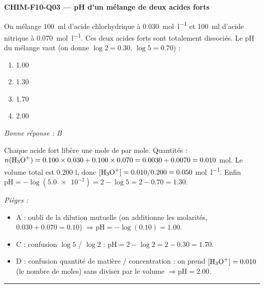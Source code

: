 \documentclass[11pt,a4paper]{article}
\begin{document}
\noindent\textbf{CHIM-F10-Q03 --- pH d'un mélange de deux acides forts}\par
On mélange \qty{100}{\milli\litre} d'acide chlorhydrique  à \qty{0.030}{\mol\per\litre} et \qty{100}{\milli\litre} d'acide nitrique  à \qty{0.070}{\mol\per\litre}. Ces deux acides forts sont totalement dissociés. Le pH du mélange vaut (on donne $\log 2 = \num{0.30}$, $\log 5 = \num{0.70}$) :
\begin{enumerate}[label=\Alph*)]
\item \num{1.00}
\item \num{1.30}
\item \num{1.70}
\item \num{2.00}
\end{enumerate}
\textit{Bonne réponse : B}\par
Chaque acide fort libère une mole de  par mole. Quantités : $n(\ce{H3O+}) = \num{0.100}\times\num{0.030} + \num{0.100}\times\num{0.070} = \num{0.0030} + \num{0.0070} = \num{0.010}$ \si{\mol}. Le volume total est $\num{0.200}$ \si{\litre}, donc $[\ce{H3O+}] = \num{0.010}/\num{0.200} = \num{0.050}$ \si{\mol\per\litre}. Enfin $\mathrm{pH} = -\log(\num{5.0e-2}) = 2 - \log 5 = 2 - \num{0.70} = \num{1.30}$.\par
\textit{Pièges :}
\begin{itemize}
\item A : oubli de la dilution mutuelle (on additionne les molarités, $\num{0.030}+\num{0.070}=\num{0.10}$) $\Rightarrow \mathrm{pH} = -\log(\num{0.10}) = \num{1.00}$.
\item C : confusion $\log 5$ / $\log 2$ : $\mathrm{pH} = 2 - \log 2 = 2 - \num{0.30} = \num{1.70}$.
\item D : confusion quantité de matière / concentration : on prend $[\ce{H3O+}] = \num{0.010}$ (le nombre de moles) sans diviser par le volume $\Rightarrow \mathrm{pH} = \num{2.00}$.
\end{itemize}
\vspace{6pt}\hrule\vspace{8pt}
\end{document}
